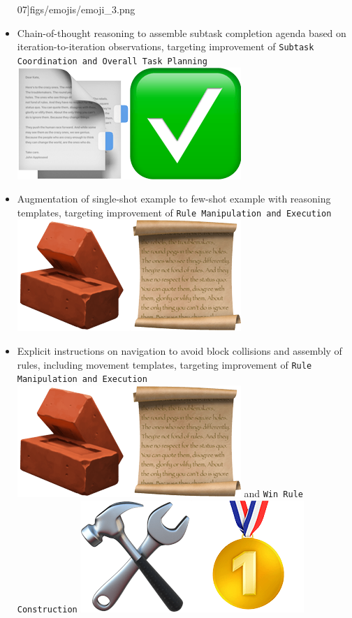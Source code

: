 \begin{itemize}
07]{figs/emojis/emoji_3.png}
    \item Chain-of-thought reasoning to assemble subtask completion agenda based on iteration-to-iteration observations, targeting improvement of \texttt{Subtask Coordination and Overall Task Planning} \includegraphics[scale=0.07]{figs/emojis/emoji_8.png}
    \item Augmentation of single-shot example to few-shot example with reasoning templates, targeting improvement of \texttt{Rule Manipulation and Execution} \includegraphics[scale=0.07]{figs/emojis/emoji_7.png}
    \item Explicit instructions on navigation to avoid block collisions and assembly of rules, including movement templates, targeting improvement of \texttt{Rule Manipulation and Execution} \includegraphics[scale=0.07]{figs/emojis/emoji_7.png} and \texttt{Win Rule Construction} \includegraphics[scale=0.07]{figs/emojis/emoji_5.png}
\end{itemize}

